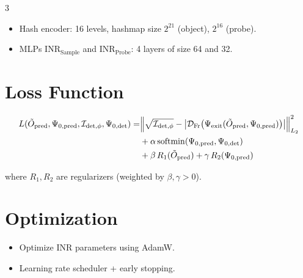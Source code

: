 \documentclass[18pt,a1paper,landscape]{extarticle}
\begin{document}
\begin{parcolumns}[rulebetween, colwidths={1=0.33\textwidth, 2=0.33\textwidth, 3=0.33\textwidth}, distance=0.8cm]{3}
{\begin{itemize}
  \item Hash encoder: 16 levels, hashmap size $2^{21}$ (object), $2^{16}$ (probe).
  \item MLPs $\mathrm{INR}_{\text{Sample}}$ and $\mathrm{INR}_{\text{Probe}}$:
        4 layers of size 64 and 32.
\end{itemize}

\section*{Loss Function}

\[
\begin{aligned}
L(\tilde{O}_{\text{pred}}, \Psi_{0,\text{pred}}, 
  \mathcal{I}_{\text{det},\phi}, \Psi_{0,\text{det}}) 
  =& \norm{
    \sqrt{\mathcal{I}_{\text{det},\phi}} -
    \abs{\mathcal{D}_{\text{Fr}}\big(
      \Psi_{\text{exit}}(\tilde{O}_{\text{pred}}, \Psi_{0,\text{pred}})
    \big)}
  }_{L_2}^2 \\
  &+ \alpha\, \mathrm{softmin}(\Psi_{0,\text{pred}}, \Psi_{0,\text{det}}) \\
  &+ \beta\, R_1(\tilde{O}_{\text{pred}}) + \gamma\, R_2(\Psi_{0,\text{pred}})
\end{aligned}
\]

where $R_1, R_2$ are regularizers (weighted by $\beta, \gamma > 0$).

\section*{Optimization}
\begin{itemize}
  \item Optimize $\mathrm{INR}$ parameters using AdamW.
  \item Learning rate scheduler + early stopping.
\end{itemize}
}

\end{parcolumns}
\end{document}
